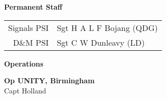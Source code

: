 \vspace*{10mm}

\pagebreak

\vspace*{10mm}

\begin{center}
  \Large
  \textbf{Permanent Staff}
\end{center}

\begin{center}
  \small
  \begin{tabular}{rl}
    Signals PSI & Sgt H A L F Bojang (QDG) \\
    D\&M PSI & Sgt C W Dunleavy (LD) \\
  \end{tabular}
\end{center}

\vspace*{10mm}

\begin{center}
  \Large
  \textbf{Operations}
\end{center}

\begin{center}
  \noindent
  \textbf{Op UNITY, Birmingham} \\
  Capt Holland \\
\end{center}
